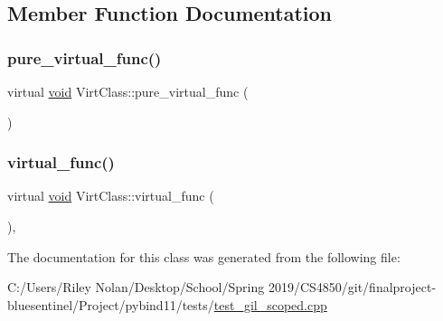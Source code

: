 \subsection{Member Function Documentation}
\mbox{\label{class_virt_class_a7d4ad19228b659f123899170a42898c6}} 
\subsubsection{\texorpdfstring{pure\_virtual\_func()}{pure\_virtual\_func()}}
{\footnotesize\ttfamily virtual \mbox{\hyperlink{_s_d_l__opengles2__gl2ext_8h_ae5d8fa23ad07c48bb609509eae494c95}{void}} Virt\+Class\+::pure\+\_\+virtual\+\_\+func (\begin{DoxyParamCaption}{ }\end{DoxyParamCaption})\hspace{0.3cm}{\ttfamily [pure virtual]}}

\mbox{\label{class_virt_class_a231872d2e6f4009701a0aa3d07b1e560}} 
\subsubsection{\texorpdfstring{virtual\_func()}{virtual\_func()}}
{\footnotesize\ttfamily virtual \mbox{\hyperlink{_s_d_l__opengles2__gl2ext_8h_ae5d8fa23ad07c48bb609509eae494c95}{void}} Virt\+Class\+::virtual\+\_\+func (\begin{DoxyParamCaption}{ }\end{DoxyParamCaption})\hspace{0.3cm}{\ttfamily [inline]}, {\ttfamily [virtual]}}



The documentation for this class was generated from the following file\+:\begin{DoxyCompactItemize}
\item 
C\+:/\+Users/\+Riley Nolan/\+Desktop/\+School/\+Spring 2019/\+C\+S4850/git/finalproject-\/bluesentinel/\+Project/pybind11/tests/\mbox{\hyperlink{test__gil__scoped_8cpp}{test\+\_\+gil\+\_\+scoped.\+cpp}}\end{DoxyCompactItemize}

